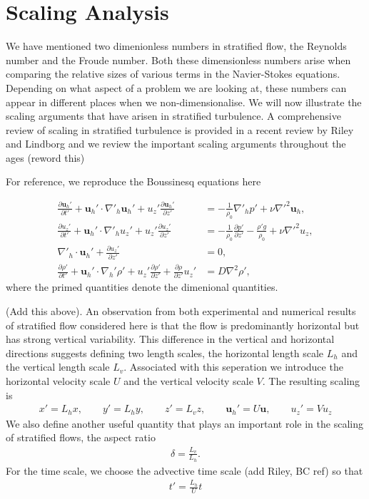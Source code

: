 \section{Scaling Analysis}
We have mentioned two dimenionless numbers in stratified flow, the Reynolds number and the Froude number. Both these dimensionless numbers arise when comparing the relative sizes of various terms in the Navier-Stokes equations. Depending on what aspect of a problem we are looking at, these numbers can appear in different places when we non-dimensionalise. We will now illustrate the scaling arguments that have arisen in stratified turbulence. A comprehensive review of scaling in stratified turbulence is provided in a recent review by Riley and Lindborg and we review the important scaling arguments throughout the ages (reword this)

For reference, we reproduce the Boussinesq equations here

\begin{align}
\frac{\partial \textbf{u}_{h}'}{\partial t'} + \textbf{u}_{h}'\cdot\nabla'_{h}\textbf{u}_{h}'+u_{z}'\frac{\partial \textbf{u}_{h}'}{\partial z'} &= -\frac{1}{\rho_{0}}\nabla'_{h}p' + \nu \nabla'^{2}\textbf{u}_{h},\\
\frac{\partial u_{z}'}{\partial t'} + \textbf{u}_{h}'\cdot\nabla'_{h}u_{z}'+u_{z}'\frac{\partial u_{z}'}{\partial z'} &= -\frac{1}{\rho_{0}}\frac{\partial p'}{\partial z'} - \frac{\rho' g}{\rho_{0}} + \nu \nabla'^{2}u_{z},\\
\nabla'_{h}\cdot\textbf{u}_{h}' + \frac{\partial u_{z}'}{\partial z'} &=0,\\
\frac{\partial \rho'}{\partial t'} + \textbf{u}_{h}'\cdot\nabla_{h}'\rho' + u_{z}'\frac{\partial \rho'}{\partial z'} + \frac{\partial \rho}{\partial z'}u_{z}'&=D\nabla^{2}\rho ',
\end{align}
where the primed quantities denote the dimenional quantities. 

(Add this above). An observation from both experimental and numerical results of stratified flow considered here is that the flow is predominantly horizontal but has strong vertical variability. This difference in the vertical and horizontal directions suggests defining two length scales, the horizontal length scale $L_{h}$ and the vertical length scale $L_{v}$. Associated with this seperation we introduce the horizontal velocity scale $U$ and the vertical velocity scale $V$. The resulting scaling is
\begin{align}
x'=L_{h}x,\qquad y' =L_{h}y, \qquad z'=L_{v}z, \qquad \textbf{u}_{h}' = U\textbf{u}, \qquad u_{z}' = Vu_{z}
\end{align}
We also define another useful quantity that plays an important role in the scaling of stratified flows, the aspect ratio
\begin{align}
\delta = \frac{L_{v}}{L_{h}}.
\end{align}
For the time scale, we choose the advective time scale (add Riley, BC ref) so that 
\begin{align}
t' = \frac{L_{h}}{U}t
\end{align}

